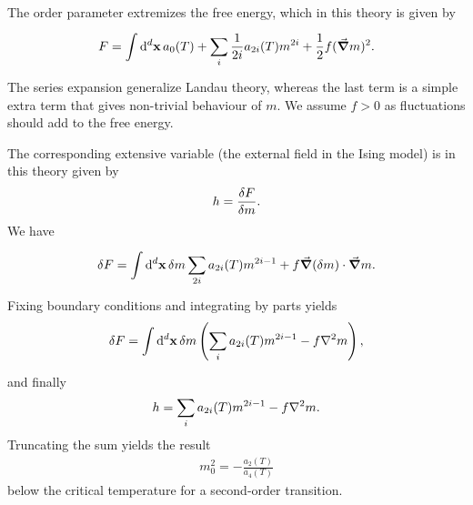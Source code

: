 The order parameter extremizes the free energy, which in this theory is given by
\begin{align*}
	F = \int\limits_{}^{}\dd[d]{\vb{x}}a_{0}(T) + \sum\limits_{i}\frac{1}{2i}a_{2i}(T)m^{2i} + \frac{1}{2}f(\grad{m})^{2}.
\end{align*}
The series expansion generalize Landau theory, whereas the last term is a simple extra term that gives non-trivial behaviour of $m$. We assume $f > 0$ as fluctuations should add to the free energy.

The corresponding extensive variable (the external field in the Ising model) is in this theory given by
\begin{align*}
	h = \fdv{F}{m}.
\end{align*}
We have
\begin{align*}
	\var{F} = \int\limits_{}^{}\dd[d]{\vb{x}}\var{m}\sum\limits_{2i}a_{2i}(T)m^{2i - 1} + f\grad{(\var{m})}\cdot\grad{m}.
\end{align*}
Fixing boundary conditions and integrating by parts yields
\begin{align*}
	\var{F} = \integ[d]{}{}{\vb{x}}{\var{m}\left(\sum\limits_{i}a_{2i}(T)m^{2i - 1} - f\laplacian{m}\right)},
\end{align*}
and finally
\begin{align*}
	h = \sum\limits_{i}a_{2i}(T)m^{2i - 1} - f\laplacian{m}.
\end{align*}
Truncating the sum yields the result
\begin{align*}
	m_{0}^{2} = -\frac{a_{2}(T)}{a_{4}(T)}
\end{align*}
below the critical temperature for a second-order transition.

